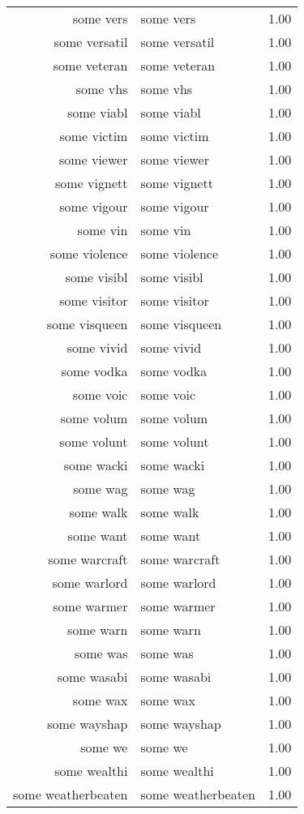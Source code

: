 \begin{table}[ht]
\begin{tabular}{rlr}
  some vers & some vers & 1.00 \\ 
  some versatil & some versatil & 1.00 \\ 
  some veteran & some veteran & 1.00 \\ 
  some vhs & some vhs & 1.00 \\ 
  some viabl & some viabl & 1.00 \\ 
  some victim & some victim & 1.00 \\ 
  some viewer & some viewer & 1.00 \\ 
  some vignett & some vignett & 1.00 \\ 
  some vigour & some vigour & 1.00 \\ 
  some vin & some vin & 1.00 \\ 
  some violence & some violence & 1.00 \\ 
  some visibl & some visibl & 1.00 \\ 
  some visitor & some visitor & 1.00 \\ 
  some visqueen & some visqueen & 1.00 \\ 
  some vivid & some vivid & 1.00 \\ 
  some vodka & some vodka & 1.00 \\ 
  some voic & some voic & 1.00 \\ 
  some volum & some volum & 1.00 \\ 
  some volunt & some volunt & 1.00 \\ 
  some wacki & some wacki & 1.00 \\ 
  some wag & some wag & 1.00 \\ 
  some walk & some walk & 1.00 \\ 
  some want & some want & 1.00 \\ 
  some warcraft & some warcraft & 1.00 \\ 
  some warlord & some warlord & 1.00 \\ 
  some warmer & some warmer & 1.00 \\ 
  some warn & some warn & 1.00 \\ 
  some was & some was & 1.00 \\ 
  some wasabi & some wasabi & 1.00 \\ 
  some wax & some wax & 1.00 \\ 
  some wayshap & some wayshap & 1.00 \\ 
  some we & some we & 1.00 \\ 
  some wealthi & some wealthi & 1.00 \\ 
  some weatherbeaten & some weatherbeaten & 1.00 \\ 

\end{tabular}
\end{table}
